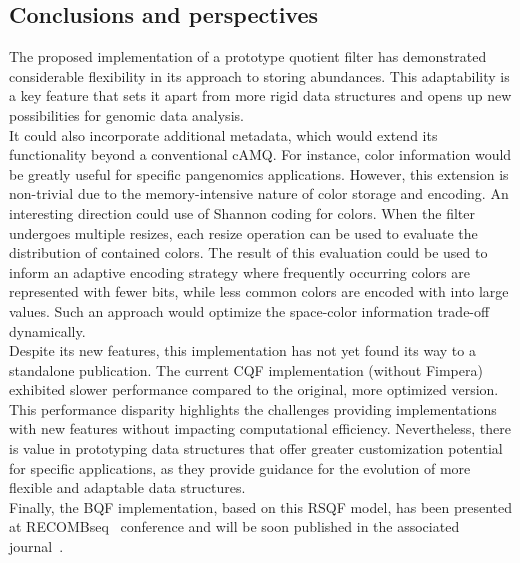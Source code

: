 \subsection{Conclusions and perspectives}
The proposed implementation of a prototype quotient filter has demonstrated considerable flexibility in its approach to storing \kmer abundances. This adaptability is a key feature that sets it apart from more rigid data structures and opens up new possibilities for genomic data analysis.\\
It could also incorporate additional metadata, which would extend its functionality beyond a conventional cAMQ. For instance, color information would be greatly useful for specific pangenomics applications. However, this extension is non-trivial due to the memory-intensive nature of color storage and encoding. An interesting direction could use of Shannon coding for colors. When the filter undergoes multiple resizes, each resize operation can be used to evaluate the distribution of contained colors. The result of this evaluation could be used to inform an adaptive encoding strategy where frequently occurring colors are represented with fewer bits, while less common colors are encoded with into large values. Such an approach would optimize the space-color information trade-off dynamically.\\
Despite its new features, this implementation has not yet found its way to a standalone publication. The current CQF implementation (without Fimpera) exhibited slower performance compared to the original, more optimized version. This performance disparity highlights the challenges providing implementations with new features without impacting computational efficiency.
Nevertheless, there is value in prototyping data structures that offer greater customization potential for specific applications, as they provide guidance for the evolution of more flexible and adaptable data structures.\\
Finally, the BQF implementation, based on this RSQF model, has been presented at RECOMBseq~\cite{recombseq} conference and will be soon published in the associated journal~\cite{bqf}.

